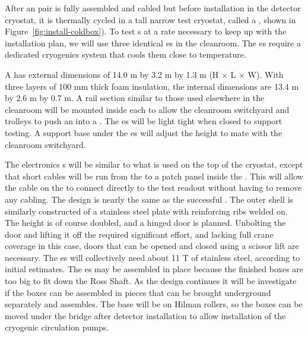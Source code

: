After an  pair is fully assembled and cabled but before installation in the detector cryostat, it is thermally cycled in a tall narrow test cryostat, called a \coldbox{}, shown in Figure~\ref{fig:install-coldbox}). 
To test s at a rate necessary to keep up with the installation plan, we will use three identical \coldbox{}es in the cleanroom. 
The \coldbox{}es require a dedicated cryogenics system that cools them  close to  temperature. 


A \coldbox has external dimensions of 14.0 \si{m} by 3.2 \si{m} by 1.3 \si{m} (H $\times$ L $\times$ W). With three layers of 100 \si{mm} thick foam insulation,  
the internal dimensions are 13.4 \si{m} by 2.6 \si{m} by 0.7 \si{m}. A rail section similar to those used elsewhere in the cleanroom will be mounted inside each \coldbox to allow the cleanroom switchyard and trolleys to push an    into a \coldbox. The \coldbox{}es will be light tight when closed to support  testing. A support base under the \coldbox{}es will adjust the height to mate with the cleanroom switchyard.

 
The \coldbox electronics \fdth{}s  will be  similar to what is used on the top of the  cryostat, except that short cables will be run from the   to a patch panel inside the \coldbox. This will allow the cable on the  to connect directly to the test readout without having to remove any cabling. The \coldbox  design is nearly the same as the successful  \coldbox. The outer shell is similarly constructed of a stainless steel plate with reinforcing ribs welded on. The height is of course doubled, and a hinged door is planned. Unbolting the door and lifting it off the  \coldbox required significant effort, and lacking full crane coverage in this case, doors that can be opened and closed using a scissor lift are necessary. The  \coldbox{}es will collectively need about 11 \si{T} of stainless steel, according to initial estimates. The \coldbox{}es may be assembled in place because the finished boxes are too big to fit down the Ross Shaft. As the design continues it will be investigate if the boxes can be assembled in pieces that can be brought underground separately and assembles. The \coldbox base will be on Hilman rollers, so the boxes can be moved under the bridge after detector installation  to allow installation of the cryogenic circulation pumps.




